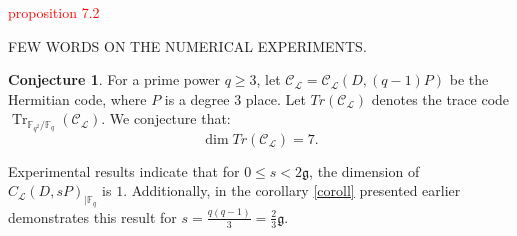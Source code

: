 \documentclass[11pt]{amsart}
\theoremstyle{plain}
\theoremstyle{definition}
\newtheorem{conjecture}{Conjecture}[section]
\theoremstyle{remark}
\newcommand{\g}{\mathfrak{g}}
\DeclareMathOperator{\trace}{Tr}
\newcommand{\calC}{\mathcal{C}}
\begin{document}
\textcolor{red}{proposition 7.2 }


FEW WORDS ON THE NUMERICAL EXPERIMENTS.




\begin{conjecture} 
	For a prime power $q \geq 3$, let  $\calC_{\mathcal{L}}=\calC_{\mathcal{L}}( D, (q-1)P)$ be the Hermitian code, where $P$ is a degree 3 place. Let $Tr(\calC_{\mathcal{L}})$ denotes the trace code $\trace_{\mathbb{F}_{q^2} / \mathbb{F}_q}(\calC_{\mathcal{L}})$. We conjecture that:
	\[\dim Tr(\calC_{\mathcal{L}}) = 7 .\]
\end{conjecture}


Experimental results indicate that for $0 \leq s < 2\mathfrak{g}$, the dimension of $C_{\mathcal{L}}(D,sP)_{\mid \mathbb{F}_q}$ is $1$. Additionally, in the corollary \ref{coroll} presented earlier demonstrates this result for $ s =\frac{q(q-1)}{3}=\frac{2}{3} \g$.
\end{document}
